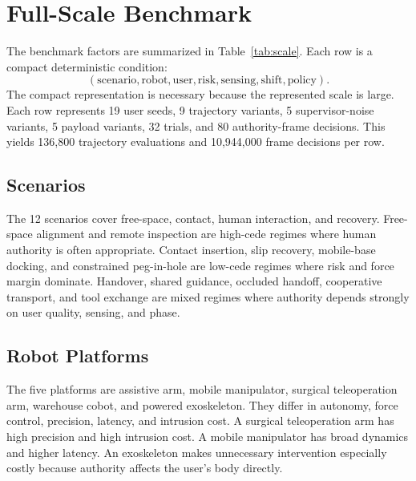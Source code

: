 \documentclass{article}
\begin{document}
\section{Full-Scale Benchmark}

\begin{table}[t]
\centering
\small

\caption{Full-scale benchmark factors. Compact condition rows represent user seeds, trajectory variants, supervisor-noise variants, payload variants, trials, and control frames.}
\label{tab:scale}
\end{table}

The benchmark factors are summarized in Table~\ref{tab:scale}. Each row is a compact deterministic condition:
\[
(\mathrm{scenario},\mathrm{robot},\mathrm{user},\mathrm{risk},\mathrm{sensing},\mathrm{shift},\mathrm{policy}).
\]
The compact representation is necessary because the represented scale is large. Each row represents 19 user seeds, 9 trajectory variants, 5 supervisor-noise variants, 5 payload variants, 32 trials, and 80 authority-frame decisions. This yields 136,800 trajectory evaluations and 10,944,000 frame decisions per row.

\subsection{Scenarios}

The 12 scenarios cover free-space, contact, human interaction, and recovery. Free-space alignment and remote inspection are high-cede regimes where human authority is often appropriate. Contact insertion, slip recovery, mobile-base docking, and constrained peg-in-hole are low-cede regimes where risk and force margin dominate. Handover, shared guidance, occluded handoff, cooperative transport, and tool exchange are mixed regimes where authority depends strongly on user quality, sensing, and phase.

\subsection{Robot Platforms}

The five platforms are assistive arm, mobile manipulator, surgical teleoperation arm, warehouse cobot, and powered exoskeleton. They differ in autonomy, force control, precision, latency, and intrusion cost. A surgical teleoperation arm has high precision and high intrusion cost. A mobile manipulator has broad dynamics and higher latency. An exoskeleton makes unnecessary intervention especially costly because authority affects the user's body directly.
\end{document}
